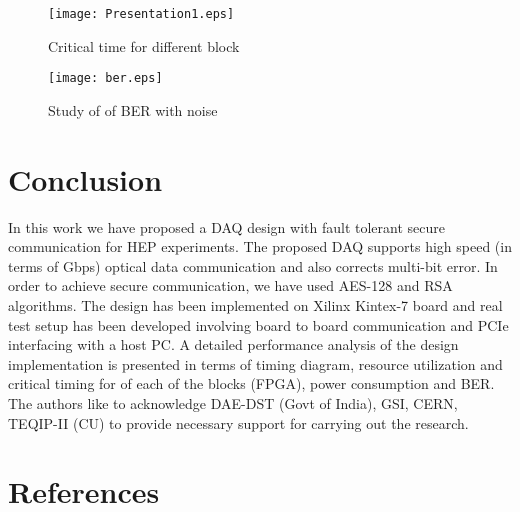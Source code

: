 \documentclass[a4paper]{jpconf}
\begin{document}
\begin{figure}[h]
\begin{minipage}{18pc}
\vspace{-5 pc}
\texttt{[image: Presentation1.eps]}
\caption{\label{fig:CiticalPathDelay}Critical time for different block }
\end{minipage}\hspace{8pc}\begin{minipage}{14pc}
\vspace{-5 pc}
\texttt{[image: ber.eps]}
\caption{\label{Rxmarginanalysis}Study of of BER with noise}
\end{minipage} 
\end{figure}
\vspace{-1 pc}
\section{Conclusion}\label{Conclusion}
In this work we have proposed a DAQ design with fault tolerant secure communication for HEP experiments. The proposed DAQ supports high speed (in terms of Gbps) optical data communication and also corrects multi-bit error. In order to achieve secure communication, we have used AES-128 and RSA algorithms. The design has been implemented on Xilinx Kintex-7 board and real test setup has been developed involving board to board communication and PCIe interfacing with a host PC. A detailed performance analysis of the design implementation is presented in terms of timing diagram, resource utilization and critical timing for of each of the blocks (FPGA), power consumption and BER.
\vspace{-1 pc}
\ack
The authors like to acknowledge  DAE-DST (Govt of India), GSI, CERN, TEQIP-II (CU) to provide necessary support for carrying out the research.


\section*{References}


\end{document}
